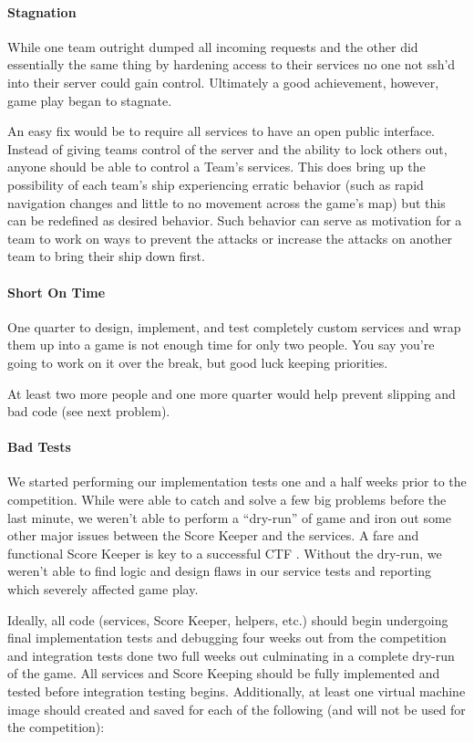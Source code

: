 \documentclass[10pt]{article}
\begin{document}
\paragraph*{Stagnation} While one team outright dumped all incoming requests and
the other did essentially the same thing by hardening access to their services
no one not ssh'd into their server could gain control. Ultimately a good
achievement, however, game play began to stagnate.

An easy fix would be to require all services to have an open public interface.
Instead of giving teams control of the server and the ability to lock others
out, anyone should be able to control a Team's services. This does bring up the
possibility of each team's ship experiencing erratic behavior (such as rapid
navigation changes and little to no movement across the game's map) but this
can be redefined as desired behavior. Such behavior can serve as motivation for
a team to work on ways to prevent the attacks or increase the attacks on
another team to bring their ship down first.

\paragraph*{Short On Time} One quarter to design, implement, and test completely
custom services and wrap them up into a game is not enough time for only two
people. You say you're going to work on it over the break, but good luck keeping
priorities.

At least two more people and one more quarter would help prevent slipping and
bad code (see next problem).

\paragraph*{Bad Tests} We started performing our implementation tests one and a
half weeks prior to the competition. While were able to catch and solve a few
big problems before the last minute, we weren't able to perform a ``dry-run'' of
game and iron out some other major issues between the Score Keeper and the
services. A fare and functional Score Keeper is key to a successful CTF \cite{}.
Without the dry-run, we weren't able to find logic and design flaws in our
service tests and reporting which severely affected game play.

Ideally, all code (services, Score Keeper, helpers, etc.) should begin
undergoing final implementation tests and debugging four weeks out from the
competition and integration tests done two full weeks out culminating in a
complete dry-run of the game. All services and Score Keeping should be fully
implemented and tested before integration testing begins. Additionally, at least
one virtual machine image should created and saved for each of the following
(and will not be used for the competition):
\end{document}
